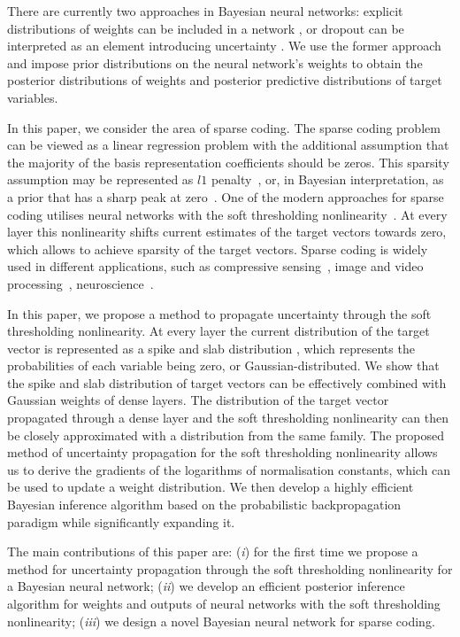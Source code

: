 \documentclass{article}
\begin{document}
There are currently two approaches in Bayesian neural networks: explicit distributions of weights can be included in a network \cite{hernandez2015probabilistic, ranganath2015deep}, or dropout can be interpreted as an element introducing uncertainty \cite{gal2016dropout}. We use the former approach and impose prior distributions on the neural network's weights to obtain the posterior distributions of weights and posterior predictive distributions of target variables.

In this paper, we consider the area of sparse coding. The sparse coding problem can be viewed as a linear regression problem with the additional assumption that the majority of the basis representation coefficients should be zeros. This sparsity assumption may be represented as $l1$ penalty~\cite{tibshirani1996regression}, or, in Bayesian interpretation, as a prior that has a sharp peak at zero~\cite{tipping2001sparse}. One of the modern approaches for sparse coding utilises neural networks with the soft thresholding nonlinearity~\cite{gregor2010learning, sprechmann2015learning}. At every layer this nonlinearity shifts current estimates of the target vectors towards zero, which allows to achieve sparsity of the target vectors. Sparse coding is widely used in different applications, such as compressive sensing~\cite{candes2008introduction}, image and video processing~\cite{mairal2014sparse, wang2015deep}, neuroscience~\cite{baillet1997bayesian, jas2017learning}.

In this paper, we propose a method to propagate uncertainty through the soft thresholding nonlinearity. At every layer the current distribution of the target vector is represented as a spike and slab distribution \cite{mitchell1988bayesian}, which represents the probabilities of each variable being zero, or Gaussian-distributed. We show that the spike and slab distribution of target vectors can be effectively combined with Gaussian weights of dense layers. The distribution of the target vector propagated through a dense layer and the soft thresholding nonlinearity can then be closely approximated with a distribution from the same family. The proposed method of uncertainty propagation for the soft thresholding nonlinearity allows us to derive the gradients of the logarithms of normalisation constants, which can be used to update a weight distribution. We then develop a highly efficient Bayesian inference algorithm based on the probabilistic backpropagation paradigm while significantly expanding it.

The main contributions of this paper are: (\textit{i}) for the first time we propose a method for uncertainty propagation through the soft thresholding nonlinearity for a Bayesian neural network; (\textit{ii}) we develop an efficient posterior inference algorithm for weights and outputs of neural networks with the soft thresholding nonlinearity; (\textit{iii}) we design a novel Bayesian neural network for sparse coding.
\end{document}
